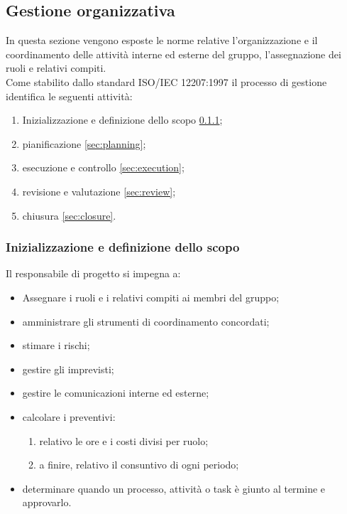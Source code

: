 \subsection{Gestione organizzativa}\label{sec:organizationalP}
    In questa sezione vengono esposte le norme relative l'organizzazione e il coordinamento delle attività interne ed esterne del gruppo, l'assegnazione dei ruoli e relativi compiti. \\
    Come stabilito dallo standard ISO/IEC 12207:1997 \cite{bib:ISO12207_1997} il processo di gestione identifica le seguenti attività:
    \begin{enumerate}
        \item Inizializzazione e definizione dello scopo \ref{sec:scope};
        \item pianificazione \ref{sec:planning};
        \item esecuzione e controllo \ref{sec:execution};
        \item revisione e valutazione \ref{sec:review};
        \item chiusura \ref{sec:closure}.
    \end{enumerate}
    \subsubsection{Inizializzazione e definizione dello scopo}\label{sec:scope}
        Il responsabile di progetto si impegna a:
        \begin{itemize}
            \item Assegnare i ruoli e i relativi compiti ai membri del gruppo;
            \item amministrare gli strumenti di coordinamento concordati;
            \item stimare i rischi;
            \item gestire gli imprevisti;
            \item gestire le comunicazioni interne ed esterne;
            \item calcolare i preventivi:
            \begin{enumerate}
                \item relativo le ore e i costi divisi per ruolo;
                \item a finire, relativo il consuntivo di ogni periodo;
            \end{enumerate}
            \item determinare quando un processo, attività o task è giunto al termine e approvarlo. 
        \end{itemize}
